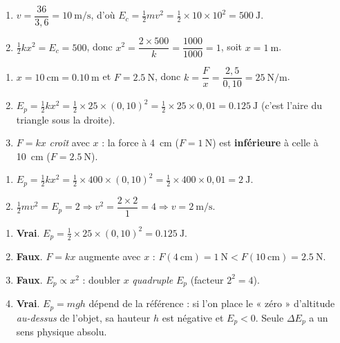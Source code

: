 \documentclass[11pt,a4paper]{article}
\begin{document}

\begin{corrige}
\begin{enumerate}[label=\alph*)]
  \item $v=\dfrac{36}{3,6}=\qty{10}{\metre\per\second}$, d'où
        $E_c=\tfrac12 m v^2=\tfrac12\times10\times10^2=\qty{500}{\joule}$.
  \item $\tfrac12 k x^2=E_c=500$, donc $x^2=\dfrac{2\times500}{k}=\dfrac{1000}{1000}=1$, soit
        $x=\qty{1}{\metre}$.
\end{enumerate}
\end{corrige}

\begin{corrige}
\begin{enumerate}[label=\alph*)]
  \item $x=\qty{10}{\centi\metre}=\qty{0,10}{\metre}$ et $F=\qty{2,5}{\newton}$, donc
        $k=\dfrac{F}{x}=\dfrac{2,5}{0,10}=\qty{25}{\newton\per\metre}$.
  \item $E_p=\tfrac12 k x^2=\tfrac12\times25\times(0,10)^2=\tfrac12\times25\times0,01=\qty{0,125}{\joule}$
        (c'est l'aire du triangle sous la droite).
  \item $F=kx$ \emph{croît} avec $x$ : la force à \qty{4}{\centi\metre} ($F=\qty{1}{\newton}$) est
        \textbf{inférieure} à celle à \qty{10}{\centi\metre} ($F=\qty{2,5}{\newton}$).
\end{enumerate}
\end{corrige}

\begin{corrige}
\begin{enumerate}[label=\alph*)]
  \item $E_p=\tfrac12 k x^2=\tfrac12\times400\times(0,10)^2=\tfrac12\times400\times0,01=\qty{2}{\joule}$.
  \item $\tfrac12 m v^2=E_p=2\Rightarrow v^2=\dfrac{2\times2}{1}=4\Rightarrow v=\qty{2}{\metre\per\second}$.
\end{enumerate}
\end{corrige}

\begin{corrige}
\begin{enumerate}[label=\alph*)]
  \item \textbf{Vrai}. $E_p=\tfrac12\times25\times(0,10)^2=\qty{0,125}{\joule}$.
  \item \textbf{Faux}. $F=kx$ augmente avec $x$ : $F(\qty{4}{\centi\metre})=\qty{1}{\newton}<F(\qty{10}{\centi\metre})=\qty{2,5}{\newton}$.
  \item \textbf{Faux}. $E_p\propto x^2$ : doubler $x$ \emph{quadruple} $E_p$ (facteur $2^2=4$).
  \item \textbf{Vrai}. $E_p=mgh$ dépend de la référence : si l'on place le « zéro » d'altitude
        \emph{au-dessus} de l'objet, sa hauteur $h$ est négative et $E_p<0$. Seule $\Delta E_p$ a un
        sens physique absolu.
\end{enumerate}
\end{corrige}
\end{document}
